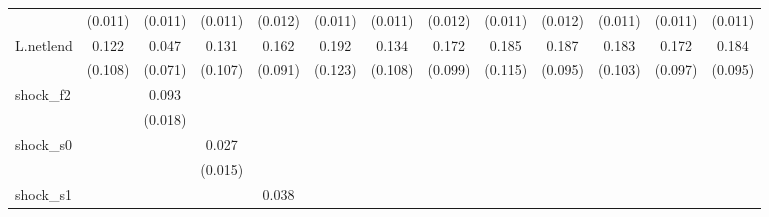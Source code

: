 {\begin{tabular}{l*{12}{c}}
            &     (0.011)         &     (0.011)         &     (0.011)         &     (0.012)         &     (0.011)         &     (0.011)         &     (0.012)         &     (0.011)         &     (0.012)         &     (0.011)         &     (0.011)         &     (0.011)         \\
\addlinespace
L.netlend   &       0.122         &       0.047         &       0.131         &       0.162\sym{*}  &       0.192         &       0.134         &       0.172\sym{*}  &       0.185         &       0.187\sym{*}  &       0.183\sym{*}  &       0.172\sym{*}  &       0.184\sym{*}  \\
            &     (0.108)         &     (0.071)         &     (0.107)         &     (0.091)         &     (0.123)         &     (0.108)         &     (0.099)         &     (0.115)         &     (0.095)         &     (0.103)         &     (0.097)         &     (0.095)         \\
\addlinespace
shock\_f2    &                     &       0.093\sym{***}&                     &                     &                     &                     &                     &                     &                     &                     &                     &                     \\
            &                     &     (0.018)         &                     &                     &                     &                     &                     &                     &                     &                     &                     &                     \\
\addlinespace
shock\_s0    &                     &                     &       0.027\sym{*}  &                     &                     &                     &                     &                     &                     &                     &                     &                     \\
            &                     &                     &     (0.015)         &                     &                     &                     &                     &                     &                     &                     &                     &                     \\
\addlinespace
shock\_s1    &                     &                     &                     &       0.038\sym{**} &                     &                     &                     &                     &                     &                     &                     &                     \\

\end{tabular}}
